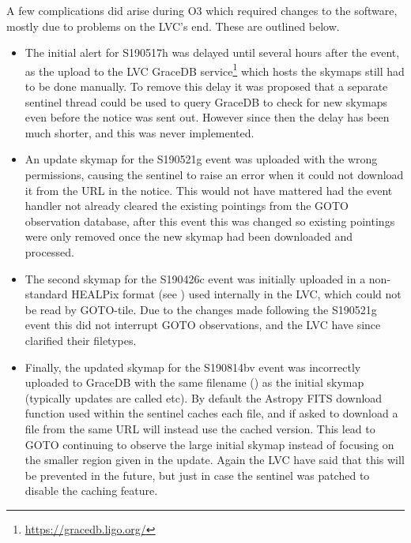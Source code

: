 \begin{colsection}
\begin{colsection}
A few complications did arise during O3 which required changes to the software, mostly due to problems on the LVC's end. These are outlined below.

\begin{itemize}
    \item The initial alert for S190517h was delayed until several hours after the event, as the upload to the LVC GraceDB service\footnote{\url{https://gracedb.ligo.org/}} which hosts the skymaps still had to be done manually. To remove this delay it was proposed that a separate sentinel thread could be used to query GraceDB to check for new skymaps even before the notice was sent out. However since then the delay has been much shorter, and this was never implemented.
    \item An update skymap for the S190521g event was uploaded with the wrong permissions, causing the sentinel to raise an error when it could not download it from the URL in the notice. This would not have mattered had the event handler not already cleared the existing pointings from the GOTO observation database, after this event this was changed so existing pointings were only removed once the new skymap had been downloaded and processed.
    \item The second skymap for the S190426c event was initially uploaded in a non-standard HEALPix format (see ) used internally in the LVC, which could not be read by GOTO-tile. Due to the changes made following the S190521g event this did not interrupt GOTO observations, and the LVC have since clarified their filetypes.
    \item Finally, the updated skymap for the S190814bv event was incorrectly uploaded to GraceDB with the same filename () as the initial skymap (typically updates are called  etc). By default the Astropy FITS download function used within the sentinel caches each file, and if asked to download a file from the same URL will instead use the cached version. This lead to GOTO continuing to observe the large initial skymap instead of focusing on the smaller region given in the update. Again the LVC have said that this will be prevented in the future, but just in case the sentinel was patched to disable the caching feature.
\end{itemize}

\end{colsection}


\end{colsection}

